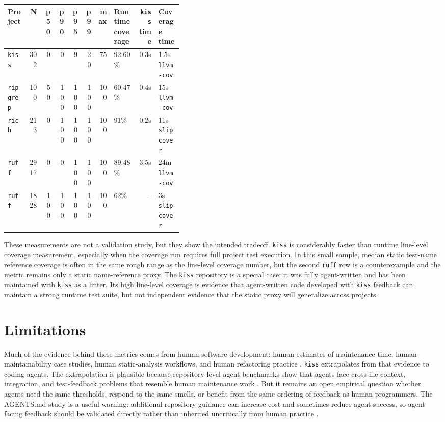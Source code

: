 \documentclass[11pt]{article}
\begin{document}
\begingroup
\small
\setlength{\tabcolsep}{3pt}
\begin{longtable}{p{0.12\linewidth}r r r r r r p{0.14\linewidth}r p{0.14\linewidth}}
\toprule
Project & N & p50 & p90 & p95 & p99 & max & Runtime coverage & \texttt{kiss} time &
Coverage time \\
\midrule
\endhead
\texttt{kiss} & 302 & 0 & 0 & 9 & 20 & 75 & 92.60\% &
0.3s & 1.5s \texttt{llvm-cov} \\
\texttt{ripgrep} & 100 & 50 & 100 & 100 & 100 & 100 & 60.47\% &
0.4s & 15s \texttt{llvm-cov} \\
\texttt{rich} & 213 & 0 & 100 & 100 & 100 & 100 & 91\% &
0.2s & 11s \texttt{slipcover} \\
\texttt{ruff} & 2917 & 0 & 0 & 100 & 100 & 100 & 89.48\% &
3.5s & 24m \texttt{llvm-cov} \\
\texttt{ruff} & 1828 & 100 & 100 & 100 & 100 & 100 & 62\% &
-- & 3s \texttt{slipcover} \\
\bottomrule
\end{longtable}
\endgroup

These measurements are not a validation study, but they show the intended
tradeoff.  \texttt{kiss} is considerably faster than runtime line-level coverage
measurement, especially when the coverage run requires full project test
execution.  In this small sample, median static test-name reference coverage is often
in the same rough range as the line-level coverage number, but the second
\texttt{ruff} row is a counterexample and the metric remains only a static
name-reference proxy.  The \texttt{kiss} repository is a special case: it was
fully agent-written and has been maintained with \texttt{kiss} as a linter.  Its
high line-level coverage is evidence that agent-written code developed with
\texttt{kiss} feedback can maintain a strong runtime test suite, but not
independent evidence that the static proxy will generalize across projects.

\section{Limitations}

Much of the evidence behind these metrics comes from human software development:
human estimates of maintenance time, human maintainability case studies, human
static-analysis workflows, and human refactoring practice
\cite{antinyan,sjoberg,vassallo,motwani,fowler-refactoring}.  \texttt{kiss}
extrapolates from that evidence to coding agents.  The extrapolation is
plausible because repository-level agent benchmarks show that agents face
cross-file context, integration, and test-feedback problems that resemble human
maintenance work \cite{jimenez-swebench,zhang-codeagent}.  But it remains an
open empirical question whether agents need the same thresholds, respond to the
same smells, or benefit from the same ordering of feedback as human programmers.
The AGENTS.md study is a useful warning: additional repository guidance can
increase cost and sometimes reduce agent success, so agent-facing feedback should
be validated directly rather than inherited uncritically from human practice
\cite{gloaguen-agents}.
\end{document}
